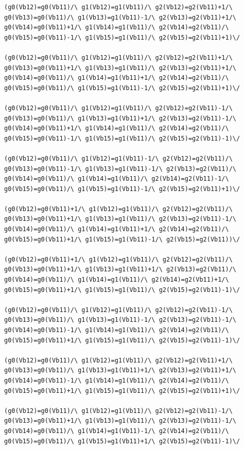 \begin{lstlisting}[language=minizinc,numbers=none,caption={Encoding for 3Dblue piece1},label={lst:constraint}]
(g0(Vb12)=g0(Vb11)/\ g1(Vb12)=g1(Vb11)/\ g2(Vb12)=g2(Vb11)+1/\ g0(Vb13)=g0(Vb11)/\ g1(Vb13)=g1(Vb11)-1/\ g2(Vb13)=g2(Vb11)+1/\ g0(Vb14)=g0(Vb11)+1/\ g1(Vb14)=g1(Vb11)/\ g2(Vb14)=g2(Vb11)/\ g0(Vb15)=g0(Vb11)-1/\ g1(Vb15)=g1(Vb11)/\ g2(Vb15)=g2(Vb11)+1)\/ 

(g0(Vb12)=g0(Vb11)/\ g1(Vb12)=g1(Vb11)/\ g2(Vb12)=g2(Vb11)+1/\ g0(Vb13)=g0(Vb11)+1/\ g1(Vb13)=g1(Vb11)/\ g2(Vb13)=g2(Vb11)+1/\ g0(Vb14)=g0(Vb11)/\ g1(Vb14)=g1(Vb11)+1/\ g2(Vb14)=g2(Vb11)/\ g0(Vb15)=g0(Vb11)/\ g1(Vb15)=g1(Vb11)-1/\ g2(Vb15)=g2(Vb11)+1)\/ 

(g0(Vb12)=g0(Vb11)/\ g1(Vb12)=g1(Vb11)/\ g2(Vb12)=g2(Vb11)-1/\ g0(Vb13)=g0(Vb11)/\ g1(Vb13)=g1(Vb11)+1/\ g2(Vb13)=g2(Vb11)-1/\ g0(Vb14)=g0(Vb11)+1/\ g1(Vb14)=g1(Vb11)/\ g2(Vb14)=g2(Vb11)/\ g0(Vb15)=g0(Vb11)-1/\ g1(Vb15)=g1(Vb11)/\ g2(Vb15)=g2(Vb11)-1)\/ 

(g0(Vb12)=g0(Vb11)/\ g1(Vb12)=g1(Vb11)-1/\ g2(Vb12)=g2(Vb11)/\ g0(Vb13)=g0(Vb11)-1/\ g1(Vb13)=g1(Vb11)-1/\ g2(Vb13)=g2(Vb11)/\ g0(Vb14)=g0(Vb11)/\ g1(Vb14)=g1(Vb11)/\ g2(Vb14)=g2(Vb11)-1/\ g0(Vb15)=g0(Vb11)/\ g1(Vb15)=g1(Vb11)-1/\ g2(Vb15)=g2(Vb11)+1)\/ 

(g0(Vb12)=g0(Vb11)+1/\ g1(Vb12)=g1(Vb11)/\ g2(Vb12)=g2(Vb11)/\ g0(Vb13)=g0(Vb11)+1/\ g1(Vb13)=g1(Vb11)/\ g2(Vb13)=g2(Vb11)-1/\ g0(Vb14)=g0(Vb11)/\ g1(Vb14)=g1(Vb11)+1/\ g2(Vb14)=g2(Vb11)/\ g0(Vb15)=g0(Vb11)+1/\ g1(Vb15)=g1(Vb11)-1/\ g2(Vb15)=g2(Vb11))\/ 

(g0(Vb12)=g0(Vb11)+1/\ g1(Vb12)=g1(Vb11)/\ g2(Vb12)=g2(Vb11)/\ g0(Vb13)=g0(Vb11)+1/\ g1(Vb13)=g1(Vb11)+1/\ g2(Vb13)=g2(Vb11)/\ g0(Vb14)=g0(Vb11)/\ g1(Vb14)=g1(Vb11)/\ g2(Vb14)=g2(Vb11)+1/\ g0(Vb15)=g0(Vb11)+1/\ g1(Vb15)=g1(Vb11)/\ g2(Vb15)=g2(Vb11)-1)\/ 

(g0(Vb12)=g0(Vb11)/\ g1(Vb12)=g1(Vb11)/\ g2(Vb12)=g2(Vb11)-1/\ g0(Vb13)=g0(Vb11)/\ g1(Vb13)=g1(Vb11)-1/\ g2(Vb13)=g2(Vb11)-1/\ g0(Vb14)=g0(Vb11)-1/\ g1(Vb14)=g1(Vb11)/\ g2(Vb14)=g2(Vb11)/\ g0(Vb15)=g0(Vb11)+1/\ g1(Vb15)=g1(Vb11)/\ g2(Vb15)=g2(Vb11)-1)\/ 

(g0(Vb12)=g0(Vb11)/\ g1(Vb12)=g1(Vb11)/\ g2(Vb12)=g2(Vb11)+1/\ g0(Vb13)=g0(Vb11)/\ g1(Vb13)=g1(Vb11)+1/\ g2(Vb13)=g2(Vb11)+1/\ g0(Vb14)=g0(Vb11)-1/\ g1(Vb14)=g1(Vb11)/\ g2(Vb14)=g2(Vb11)/\ g0(Vb15)=g0(Vb11)+1/\ g1(Vb15)=g1(Vb11)/\ g2(Vb15)=g2(Vb11)+1)\/ 

(g0(Vb12)=g0(Vb11)/\ g1(Vb12)=g1(Vb11)/\ g2(Vb12)=g2(Vb11)-1/\ g0(Vb13)=g0(Vb11)+1/\ g1(Vb13)=g1(Vb11)/\ g2(Vb13)=g2(Vb11)-1/\ g0(Vb14)=g0(Vb11)/\ g1(Vb14)=g1(Vb11)-1/\ g2(Vb14)=g2(Vb11)/\ g0(Vb15)=g0(Vb11)/\ g1(Vb15)=g1(Vb11)+1/\ g2(Vb15)=g2(Vb11)-1)\/ 


\end{lstlisting}
